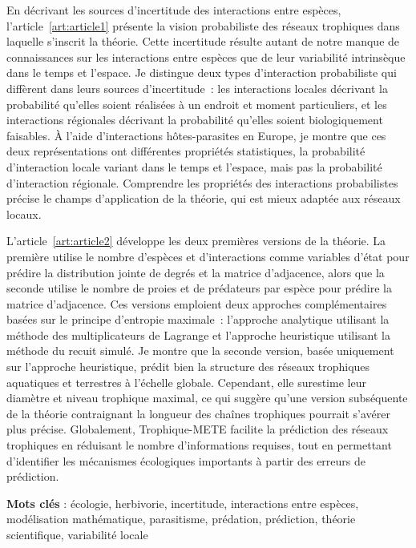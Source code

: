 \documentclass[12pt,twoside,phd]{dms}
\numberwithin{equation}{section}
\numberwithin{table}{chapter}
\numberwithin{figure}{chapter}
\begin{document}
En décrivant les sources d'incertitude des interactions entre espèces,
l'article~\ref{art:article1} présente la vision probabiliste des réseaux
trophiques dans laquelle s'inscrit la théorie. Cette incertitude résulte autant
de notre manque de connaissances sur les interactions entre espèces que de leur
variabilité intrinsèque dans le temps et l'espace. Je distingue deux types
d'interaction probabiliste qui diffèrent dans leurs sources d'incertitude~: les
interactions locales décrivant la probabilité qu'elles soient réalisées à un
endroit et moment particuliers, et les interactions régionales décrivant la
probabilité qu'elles soient biologiquement faisables. À l'aide d'interactions
hôtes-parasites en Europe, je montre que ces deux représentations ont
différentes propriétés statistiques, la probabilité d'interaction locale variant
dans le temps et l'espace, mais pas la probabilité d'interaction régionale.
Comprendre les propriétés des interactions probabilistes précise le champs
d'application de la théorie, qui est mieux adaptée aux réseaux locaux.

L'article~\ref{art:article2} développe les deux premières versions de la
théorie. La première utilise le nombre d'espèces et d'interactions comme
variables d'état pour prédire la distribution jointe de degrés et la matrice
d'adjacence, alors que la seconde utilise le nombre de proies et de prédateurs
par espèce pour prédire la matrice d'adjacence. Ces versions emploient deux
approches complémentaires basées sur le principe d'entropie maximale~:
l'approche analytique utilisant la méthode des multiplicateurs de Lagrange et
l'approche heuristique utilisant la méthode du recuit simulé. Je montre que la
seconde version, basée uniquement sur l'approche heuristique, prédit bien la
structure des réseaux trophiques aquatiques et terrestres à l'échelle globale.
Cependant, elle surestime leur diamètre et niveau trophique maximal, ce qui
suggère qu'une version subséquente de la théorie contraignant la longueur des
chaînes trophiques pourrait s'avérer plus précise. Globalement, Trophique-METE
facilite la prédiction des réseaux trophiques en réduisant le nombre
d'informations requises, tout en permettant d'identifier les mécanismes
écologiques importants à partir des erreurs de prédiction.

\textbf{Mots clés} : écologie, herbivorie, incertitude, interactions entre
espèces, modélisation mathématique, parasitisme, prédation, prédiction, théorie
scientifique, variabilité locale  

\end{document}

